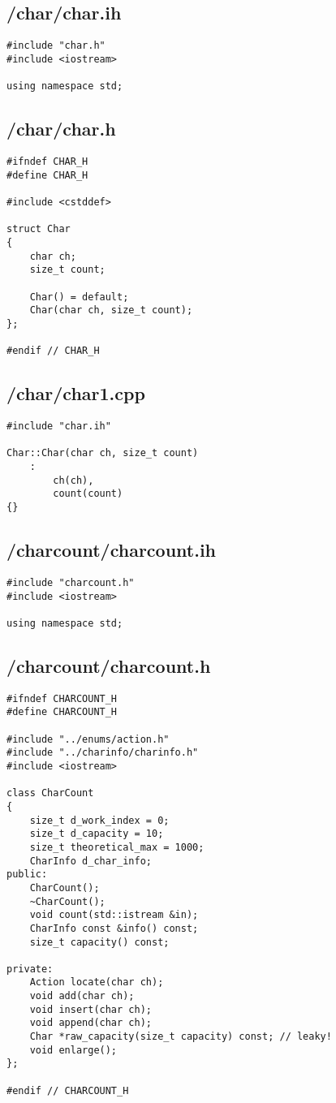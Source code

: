 \documentclass{article}
\begin{document}
\subsection*{/char/char.ih}
\begin{verbatim}
#include "char.h"
#include <iostream>

using namespace std;

\end{verbatim}
\subsection*{/char/char.h}
\begin{verbatim}
#ifndef CHAR_H
#define CHAR_H

#include <cstddef>

struct Char 
{
    char ch;
    size_t count;

    Char() = default;
    Char(char ch, size_t count);
};

#endif // CHAR_H

\end{verbatim}
\subsection*{/char/char1.cpp}
\begin{verbatim}
#include "char.ih"

Char::Char(char ch, size_t count)
    :
        ch(ch),
        count(count)
{}
\end{verbatim}

\subsection*{/charcount/charcount.ih}
\begin{verbatim}
#include "charcount.h"
#include <iostream>

using namespace std;

\end{verbatim}
\subsection*{/charcount/charcount.h}
\begin{verbatim}
#ifndef CHARCOUNT_H
#define CHARCOUNT_H

#include "../enums/action.h"
#include "../charinfo/charinfo.h"
#include <iostream>

class CharCount 
{
    size_t d_work_index = 0;
    size_t d_capacity = 10;
    size_t theoretical_max = 1000;
    CharInfo d_char_info;
public:
    CharCount();
    ~CharCount();
    void count(std::istream &in);
    CharInfo const &info() const;
    size_t capacity() const;

private:
    Action locate(char ch);
    void add(char ch);
    void insert(char ch);
    void append(char ch);
    Char *raw_capacity(size_t capacity) const; // leaky!
    void enlarge();
};

#endif // CHARCOUNT_H

\end{verbatim}
\end{document}
